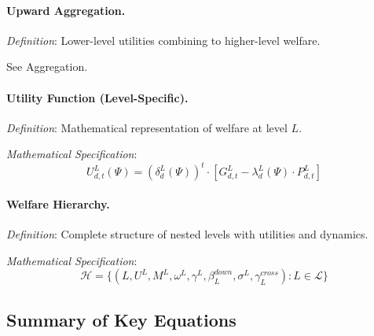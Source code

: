 \paragraph{Upward Aggregation.}
\textit{Definition}: Lower-level utilities combining to higher-level welfare.

See Aggregation.

\medskip

\paragraph{Utility Function (Level-Specific).}
\textit{Definition}: Mathematical representation of welfare at level $L$.

\textit{Mathematical Specification}:
\begin{equation}
U^L_{d,t}(\Psi) = (\delta^L_d(\Psi))^t \cdot [G^L_{d,t} - \lambda^L_d(\Psi) \cdot P^L_{d,t}]
\end{equation}

\medskip

\paragraph{Welfare Hierarchy.}
\textit{Definition}: Complete structure of nested levels with utilities and dynamics.

\textit{Mathematical Specification}:
\begin{equation}
\mathcal{H} = \{(L, U^L, M^L, \omega^L, \gamma^L, \beta^{down}_L, \sigma^L, \gamma^{cross}_L) : L \in \mathcal{L}\}
\end{equation}

\subsection*{Summary of Key Equations}

